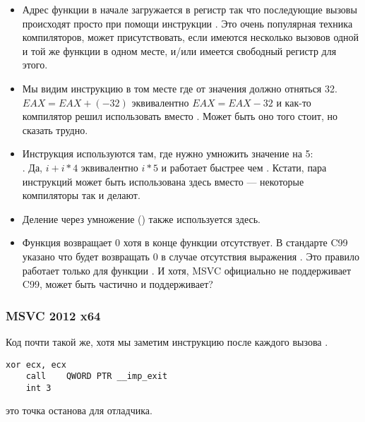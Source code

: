 \begin{itemize}
\item Адрес функции \printf в начале загружается в регистр 
\ESI так что последующие вызовы
\printf происходят просто при помощи инструкции .
Это очень популярная техника компиляторов, может присутствовать, если имеются несколько вызовов
одной и той же функции в одном месте, и/или имеется свободный регистр для этого.

\item Мы видим инструкцию  в том месте где от значения должно отняться 32.
$EAX=EAX+(-32)$ эквивалентно $EAX=EAX-32$ и как-то компилятор решил использовать  вместо .
Может быть оно того стоит, но сказать трудно.

\item Инструкция \LEA используются там, где нужно умножить значение на 5: \\
	.
Да, $i+i*4$ эквивалентно $i*5$ и \LEA работает быстрее чем .
Кстати, пара инструкций  может быть использована здесь
вместо \LEA --- некоторые компиляторы так и делают.

\item Деление через умножение () также используется здесь.

\item Функция \main возвращает 0 хотя  
в конце функции отсутствует.
В стандарте C99  указано что \main 
будет возвращать 0 в случае отсутствия выражения 
.
Это правило работает только для функции \main.
И хотя, MSVC официально не поддерживает C99, может быть частично и поддерживает?

\end{itemize}

\subsubsection{\Optimizing MSVC 2012 x64}

Код почти такой же, хотя мы заметим инструкцию  после каждого вызова .

\begin{lstlisting}[style=customasmx86]
	xor	ecx, ecx
	call	QWORD PTR __imp_exit
	int	3
\end{lstlisting}

 это точка останова для отладчика.

